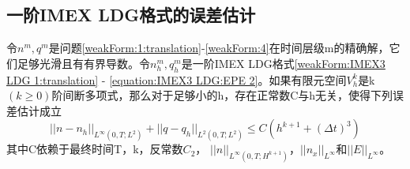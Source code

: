 \subsection{一阶IMEX LDG格式的误差估计}
\begin{theorem}
    令$n^m,q^m$是问题\eqref{weakForm:1:translation}-\ref{weakForm:4}在时间层级m的精确解，它们足够光滑且有有界导数。令$n_h^m,q_h^m$是一阶IMEX LDG格式\eqref{weakForm:IMEX3 LDG 1:translation} - \ref{equation:IMEX3 LDG:EPE 2}。如果有限元空间$V_h^k$是k$(k\geq  0)$阶间断多项式，那么对于足够小的h，存在正常数C与h无关，使得下列误差估计成立
    \begin{equation}
        ||n-n_h||_{L^{\infty}(0,T;L^2)} + ||q - q_h||_{L^2(0,T;L^2)} \leq C(h^{k+1} + (\Delta t)^3)
    \end{equation}
    其中C依赖于最终时间T，k，反常数$C_2$， $||n||_{L^{\infty}(0,T;H^{k+1})}$，$||n_x||_{L^{\infty}}$和$||E||_{L^{\infty}}$。
\end{theorem}
